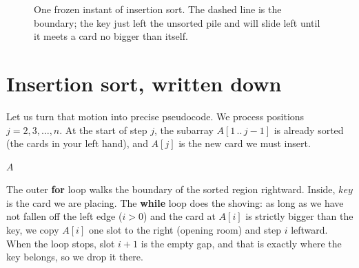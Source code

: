 \begin{figure}[H]
\centering
{}
\caption{One frozen instant of insertion sort. The dashed line is the boundary; the key
just left the unsorted pile and will slide left until it meets a card no bigger than
itself.}
\label{ch02:fig-hand}
\end{figure}

\section{Insertion sort, written down}

Let us turn that motion into precise pseudocode. We process positions $j = 2, 3,
\dots, n$. At the start of step $j$, the subarray $A[1\,..\,j-1]$ is already sorted (the
cards in your left hand), and $A[j]$ is the new card we must insert.

\begin{algorithm}[H]
\caption{\textsc{Insertion-Sort}$(A)$}
\Return $A$\;
\end{algorithm}

The outer \textbf{for} loop walks the boundary of the sorted region
rightward. Inside, $\mathit{key}$ is the card we are placing. The \textbf{while} loop
does the shoving: as long as we have not fallen off the left edge ($i > 0$) and the
card at $A[i]$ is strictly bigger than the key, we copy $A[i]$ one slot to the right
(opening room) and step $i$ leftward. When the loop stops, slot $i+1$ is the empty gap,
and that is exactly where the key belongs, so we drop it there.

